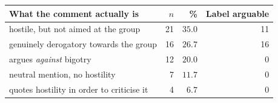 \begin{tabular}{lrrr}
\toprule
What the comment actually is & $n$ & \% & Label arguable \\
\midrule
hostile, but not aimed at the group & 21 & $35.0$ & 11 \\
genuinely derogatory towards the group & 16 & $26.7$ & 16 \\
argues \emph{against} bigotry & 12 & $20.0$ & 0 \\
neutral mention, no hostility & 7 & $11.7$ & 0 \\
quotes hostility in order to criticise it & 4 & $6.7$ & 0 \\
\bottomrule
\end{tabular}
